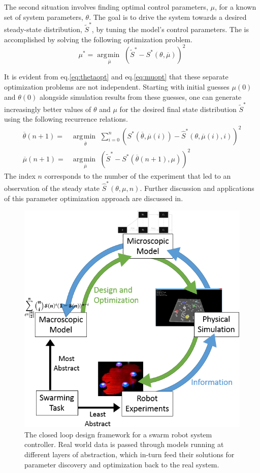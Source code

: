 \documentclass[defaultstyle,12pt]{proposal}
\DeclareMathOperator*{\argmin}{\arg\!\min\>}
\begin{document}
The second situation involves finding optimal control parameters, $\mu$, for a known set of system parameters, $\theta$. The goal is to drive the system towards a desired steady-state distribution, $\tilde{S}^*$, by tuning the model's control parameters. The is accomplished by solving the following optimization problem.
\begin{equation}
	\mu^* = \underset{\overline{\mu}}{\argmin}\left(\tilde{S}^* - S^*(\theta, \overline{\mu})\right)^2 \label{eq:muopt}
\end{equation}

It is evident from eq.\eqref{eq:thetaopt} and eq.\eqref{eq:muopt} that these separate optimization problems are not independent. Starting with initial guesses $\mu(0)$ and $\theta(0)$ alongside simulation results from these guesses, one can generate increasingly better values of $\theta$ and $\mu$ for the desired final state distribution $\tilde{S}^*$ using the following recurrence relations.
\begin{align}\label{eq:paramrel}
	\overline{\theta}(n + 1) = & \underset{\overline{\theta}}{\argmin}\sum\limits_{i=0}^{n}\left(S^*(\overline{\theta},\overline{\mu}(i)) - \hat{S}^*(\theta, \overline{\mu}(i), i)\right)^2\\
	\overline{\mu}(n + 1) = & \underset{\overline{\mu}}{\argmin}\left(\tilde{S}^* - S^*(\overline{\theta}(n + 1), \mu)\right)^2
\end{align}
The index $n$ corresponds to the number of the experiment that led to an observation of the steady state $\hat{S}^*(\theta, \mu, n)$. Further discussion and applications of this parameter optimization approach are discussed in\cite{Correll2006a,Correll2008}.

\begin{figure}[!ht]
\centering\includegraphics[width=.75\textwidth]{../assets/ssmodel.png}
\centering\caption{The closed loop design framework for a swarm robot system controller. Real world data is passed through models running at different layers of abstraction, which in-turn feed their solutions for parameter discovery and optimization back to the real system.}\label{fig:recipe}
\end{figure}
\end{document}

